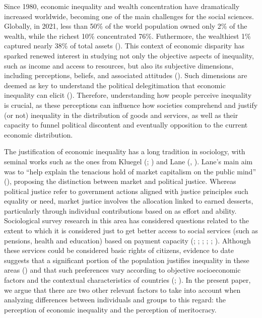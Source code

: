 \documentclass[
  12pt,
]{article}
\begin{document}
Since 1980, economic inequality and wealth concentration have
dramatically increased worldwide, becoming one of the main challenges
for the social sciences. Globally, in 2021, less than 50\% of the world
population owned only 2\% of the wealth, while the richest 10\%
concentrated 76\%. Futhermore, the wealthiest 1\% captured nearly 38\%
of total assets (). This context of economic disparity has sparked renewed interest
in studying not only the objective aspects of inequality, such as income
and access to resources, but also its subjective dimensions, including
perceptions, beliefs, and associated attitudes
(). Such dimensions
are deemed as key to understand the political delegitimation that
economic inequality can elicit
().
Therefore, understanding how people perceive inequality is crucial, as
these perceptions can influence how societies comprehend and justify (or
not) inequality in the distribution of goods and services, as well as
their capacity to funnel political discontent and eventually opposition
to the current economic distribution.

The justification of economic inequality has a long tradition in
sociology, with seminal works such as the ones from Kluegel
(;
) and Lane
(,
). Lane's main aim was to ``help
explain the tenacious hold of market capitalism on the public mind''
(), proposing the
distinction between market and political justice. Whereas political
justice refer to government actions aligned with justice principles such
equality or need, market justice involves the allocation linked to
earned desserts, particularly through individual contributions based on
as effort and ability. Sociological survey research in this area has
considered questions related to the extent to which it is considered
just to get better access to social services (such as pensions, health
and education) based on payment capacity
(;
;
;
;
;
). Although
these services could be considered basic rights of citizens, evidence to
date suggests that a significant portion of the population justifies
inequality in these areas () and that such preferences vary according to objective
socioeconomic factors and the contextual characteristics of countries
(;
). In the present paper, we
argue that there are two other relevant factors to take into account
when analyzing differences between individuals and groups to this
regard: the perception of economic inequality and the perception of
meritocracy.
\end{document}
